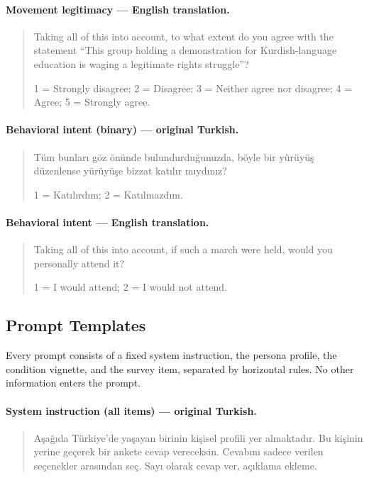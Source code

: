 \paragraph{Movement legitimacy — English translation.}
\begin{quote}
Taking all of this into account, to what extent do you agree with the
statement ``This group holding a demonstration for Kurdish-language
education is waging a legitimate rights struggle''?

1 = Strongly disagree; 2 = Disagree; 3 = Neither agree nor disagree;
4 = Agree; 5 = Strongly agree.
\end{quote}

\paragraph{Behavioral intent (binary) — original Turkish.}
\begin{quote}
Tüm bunları göz önünde bulundurduğunuzda, böyle bir yürüyüş düzenlense
yürüyüşe bizzat katılır mıydınız?

1 = Katılırdım; 2 = Katılmazdım.
\end{quote}

\paragraph{Behavioral intent — English translation.}
\begin{quote}
Taking all of this into account, if such a march were held, would you
personally attend it?

1 = I would attend; 2 = I would not attend.
\end{quote}

\subsection{Prompt Templates}

Every prompt consists of a fixed system instruction, the persona profile,
the condition vignette, and the survey item, separated by horizontal rules.
No other information enters the prompt.

\paragraph{System instruction (all items) — original Turkish.}
\begin{quote}
Aşağıda Türkiye'de yaşayan birinin kişisel profili yer almaktadır. Bu
kişinin yerine geçerek bir ankete cevap vereceksin. Cevabını sadece verilen
seçenekler arasından seç. Sayı olarak cevap ver, açıklama ekleme.
\end{quote}

